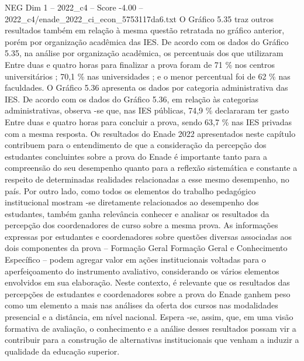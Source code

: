 \begin{textsample}{NEG Dim 1 – 2022\_c4 – Score -4.00 – 2022\_c4/enade\_2022\_ci\_econ\_5753117da6.txt}
O Gráfico 5.35 traz outros resultados também em relação à mesma questão retratada no gráfico anterior, porém por organização acadêmica das IES.
De acordo com os dados do Gráfico 5.35, na análise por organização acadêmica, os percentuais dos que utilizaram Entre duas e quatro horas para finalizar a prova foram de 71 \% nos centros universitários ; 70,1 \% nas universidades ; e o menor percentual foi de 62 \% nas faculdades.
O Gráfico 5.36 apresenta os dados por categoria administrativa das IES.
De acordo com os dados do Gráfico 5.36, em relação às categorias administrativas, observa -se que, nas IES públicas, 74,9 \% declararam ter gasto Entre duas e quatro horas para concluir a prova, sendo 63,7 \% nas IES privadas com a mesma resposta.
Os resultados do Enade 2022 apresentados neste capítulo contribuem para o entendimento de que a consideração da percepção dos estudantes concluintes sobre a prova do Enade é importante tanto para a compreensão do seu desempenho quanto para a reflexão sistemática e constante a respeito de determinadas realidades relacionadas a esse mesmo desempenho, no país.
Por outro lado, como todos os elementos do trabalho pedagógico institucional mostram -se diretamente relacionados ao desempenho dos estudantes, também ganha relevância conhecer e analisar os resultados da percepção dos coordenadores de curso sobre a mesma prova.
As informações expressas por estudantes e coordenadores sobre questões diversas associadas aos dois componentes da prova – Formação Geral Formação Geral e Conhecimento Específico – podem agregar valor em ações institucionais voltadas para o aperfeiçoamento do instrumento avaliativo, considerando os vários elementos envolvidos em sua elaboração.
Neste contexto, é relevante que os resultados das percepções de estudantes e coordenadores sobre a prova do Enade ganhem peso como um elemento a mais nas análises da oferta dos cursos nas modalidades presencial e a distância, em nível nacional.
Espera -se, assim, que, em uma visão formativa de avaliação, o conhecimento e a análise desses resultados possam vir a contribuir para a construção de alternativas institucionais que venham a induzir a qualidade da educação superior.

\end{textsample}

